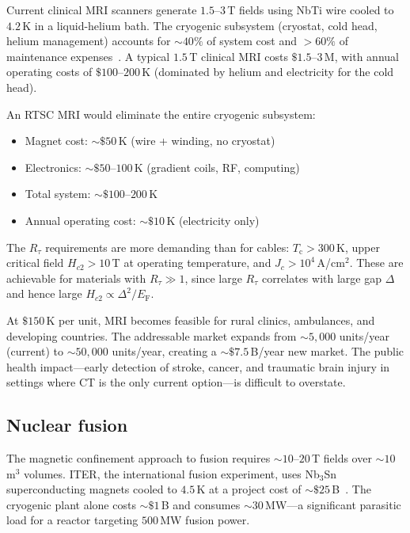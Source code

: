 \documentclass[prl,twocolumn,superscriptaddress,longbibliography,floatfix]{revtex4-2}
\newcommand{\tauasym}{\tau}
\newcommand{\Rtau}{R_{\tauasym}}
\newcommand{\Tc}{T_{\mathrm{c}}}
\newcommand{\EF}{E_{\mathrm{F}}}
\begin{document}
Current clinical MRI scanners generate $1.5$--$3\,$T fields
using NbTi wire cooled to $4.2\,$K in a liquid-helium bath.
The cryogenic subsystem (cryostat, cold head, helium
management) accounts for $\sim 40\%$ of system cost and
$> 60\%$ of maintenance expenses~\cite{Rinck2018}.  A typical
$1.5\,$T clinical MRI costs $\$1.5$--$3\,$M, with annual
operating costs of $\$100$--$200\,$K (dominated by helium
and electricity for the cold head).

An RTSC MRI would eliminate the entire cryogenic subsystem:
\begin{itemize}
\item Magnet cost: $\sim \$50\,$K (wire + winding, no cryostat)
\item Electronics: $\sim \$50$--$100\,$K (gradient coils, RF, computing)
\item Total system: $\sim \$100$--$200\,$K
\item Annual operating cost: $\sim \$10\,$K (electricity only)
\end{itemize}
The $\Rtau$ requirements are more demanding than for cables:
$\Tc > 300\,$K, upper critical field $H_{c2} > 10\,$T at
operating temperature, and $J_c > 10^4\,$A/cm$^2$.  These
are achievable for materials with $\Rtau \gg 1$, since large
$\Rtau$ correlates with large gap $\Delta$ and hence large
$H_{c2} \propto \Delta^2/\EF$.

At $\$150\,$K per unit, MRI becomes feasible for rural
clinics, ambulances, and developing countries.  The addressable
market expands from $\sim 5{,}000$ units/year (current) to
$\sim 50{,}000$ units/year, creating a $\sim \$7.5\,$B/year
new market.  The public health impact---early detection of
stroke, cancer, and traumatic brain injury in settings where
CT is the only current option---is difficult to overstate.

\subsection{Nuclear fusion}

The magnetic confinement approach to fusion requires
$\sim 10$--$20\,$T fields over $\sim 10\,$m$^3$ volumes.
ITER, the international fusion experiment, uses Nb$_3$Sn
superconducting magnets cooled to $4.5\,$K at a project cost
of $\sim \$25\,$B~\cite{ITER2020}.  The cryogenic plant alone
costs $\sim \$1\,$B and consumes $\sim 30\,$MW---a significant
parasitic load for a reactor targeting $500\,$MW fusion power.
\end{document}
